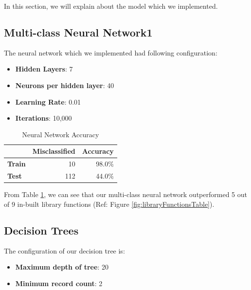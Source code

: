 \documentclass[a4paper,10pt]{article}
\begin{document}
In this section, we will explain about the model which we implemented.

\subsection{Multi-class Neural Network1}
The neural network which we implemented had following configuration:
\begin{itemize}
 \item \textbf{Hidden Layers}: 7
 \item \textbf{Neurons per hidden layer}: 40
 \item \textbf{Learning Rate}: 0.01
 \item \textbf{Iterations}: 10,000
\end{itemize}

\begin{table}[ht]
    \centering
    \caption{Neural Network Accuracy}
    \label{tbl:neural-network-accuracy}
    \begin{tabular}{|l|r|r|}
    \hline
                   & \textbf{Misclassified} & \textbf{Accuracy} \\ \hline
    \textbf{Train} & 10                     & 98.0\%            \\ \hline
    \textbf{Test}  & 112                    & 44.0\%            \\ \hline
    \end{tabular}
\end{table}

From Table \ref{tbl:neural-network-accuracy}, we can see that our multi-class neural network outperformed 5 out of 9 in-built library functions (Ref: Figure \ref{fig:libraryFunctionsTable}).

\subsection{Decision Trees}
The configuration of our decision tree is:
\begin{itemize}
 \item \textbf{Maximum depth of tree}: 20
 \item \textbf{Minimum record count}: 2
\end{itemize}
\end{document}
